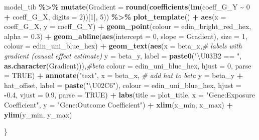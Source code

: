\documentclass[
]{article}
\newenvironment{Shaded}{\begin{snugshade}}{\end{snugshade}}
\newcommand{\AttributeTok}[1]{\textcolor[rgb]{0.13,0.29,0.53}{#1}}
\newcommand{\CommentTok}[1]{\textcolor[rgb]{0.56,0.35,0.01}{\textit{#1}}}
\newcommand{\ConstantTok}[1]{\textcolor[rgb]{0.56,0.35,0.01}{#1}}
\newcommand{\DecValTok}[1]{\textcolor[rgb]{0.00,0.00,0.81}{#1}}
\newcommand{\FloatTok}[1]{\textcolor[rgb]{0.00,0.00,0.81}{#1}}
\newcommand{\FunctionTok}[1]{\textcolor[rgb]{0.13,0.29,0.53}{\textbf{#1}}}
\newcommand{\NormalTok}[1]{#1}
\newcommand{\SpecialCharTok}[1]{\textcolor[rgb]{0.81,0.36,0.00}{\textbf{#1}}}
\newcommand{\StringTok}[1]{\textcolor[rgb]{0.31,0.60,0.02}{#1}}
\begin{document}
\begin{Shaded}
\begin{Highlighting}[]
\NormalTok{   model\_tib }\SpecialCharTok{\%\textgreater{}\%}
     \FunctionTok{mutate}\NormalTok{(}\AttributeTok{Gradient =} \FunctionTok{round}\NormalTok{(}\FunctionTok{coefficients}\NormalTok{(}\FunctionTok{lm}\NormalTok{(coeff\_G\_Y }\SpecialCharTok{\textasciitilde{}} \DecValTok{0} \SpecialCharTok{+}\NormalTok{ coeff\_G\_X, }\AttributeTok{digits =} \DecValTok{2}\NormalTok{))[}\DecValTok{1}\NormalTok{], }\DecValTok{5}\NormalTok{)) }\SpecialCharTok{\%\textgreater{}\%}
     \FunctionTok{plot\_template}\NormalTok{() }\SpecialCharTok{+}
     \FunctionTok{aes}\NormalTok{(}\AttributeTok{x =}\NormalTok{ coeff\_G\_X, }\AttributeTok{y =}\NormalTok{ coeff\_G\_Y) }\SpecialCharTok{+}
     \FunctionTok{geom\_point}\NormalTok{(}\AttributeTok{colour =}\NormalTok{ edin\_bright\_red\_hex, }\AttributeTok{alpha =} \FloatTok{0.3}\NormalTok{) }\SpecialCharTok{+}
     \FunctionTok{geom\_abline}\NormalTok{(}\FunctionTok{aes}\NormalTok{(}\AttributeTok{intercept =} \DecValTok{0}\NormalTok{,}
                     \AttributeTok{slope =}\NormalTok{ Gradient),}
                 \AttributeTok{size =} \DecValTok{1}\NormalTok{,}
                 \AttributeTok{colour =}\NormalTok{ edin\_uni\_blue\_hex) }\SpecialCharTok{+}
     \FunctionTok{geom\_text}\NormalTok{(}\FunctionTok{aes}\NormalTok{(}\AttributeTok{x =}\NormalTok{ beta\_x,}\CommentTok{\# labels with gradient (causal effect estimate)}
                   \AttributeTok{y =}\NormalTok{ beta\_y,}
                   \AttributeTok{label =} \FunctionTok{paste0}\NormalTok{(}\StringTok{"\textbackslash{}U03B2 == "}\NormalTok{, }\FunctionTok{as.character}\NormalTok{(Gradient))),}\CommentTok{\#beta}
               \AttributeTok{colour =}\NormalTok{ edin\_uni\_blue\_hex,}
               \AttributeTok{hjust =} \DecValTok{0}\NormalTok{,}
               \AttributeTok{parse =} \ConstantTok{TRUE}\NormalTok{) }\SpecialCharTok{+}
     \FunctionTok{annotate}\NormalTok{(}\StringTok{"text"}\NormalTok{,}
              \AttributeTok{x =}\NormalTok{ beta\_x,     }\CommentTok{\# add hat to beta}
              \AttributeTok{y =}\NormalTok{ beta\_y }\SpecialCharTok{+}\NormalTok{ hat\_offset,}
              \AttributeTok{label =} \FunctionTok{paste}\NormalTok{(}\StringTok{"\textbackslash{}U02C6"}\NormalTok{),}
              \AttributeTok{colour =}\NormalTok{ edin\_uni\_blue\_hex,}
              \AttributeTok{hjust =} \SpecialCharTok{{-}}\FloatTok{0.4}\NormalTok{,}
              \AttributeTok{vjust =} \FloatTok{0.9}\NormalTok{,}
              \AttributeTok{parse =} \ConstantTok{TRUE}\NormalTok{) }\SpecialCharTok{+}
     \FunctionTok{labs}\NormalTok{(}\AttributeTok{title =}\NormalTok{ plot\_title,}
          \AttributeTok{x =} \StringTok{"Gene:Exposure Coefficient"}\NormalTok{,}
          \AttributeTok{y =} \StringTok{"Gene:Outcome Coefficient"}\NormalTok{) }\SpecialCharTok{+}
     \FunctionTok{xlim}\NormalTok{(x\_min, x\_max) }\SpecialCharTok{+}
     \FunctionTok{ylim}\NormalTok{(y\_min, y\_max)}

\NormalTok{ \}}
\end{Highlighting}
\end{Shaded}
\end{document}
